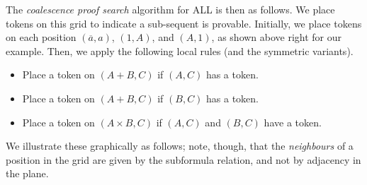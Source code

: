 \documentclass{article}
\newcommand\0{0}
\newcommand\1{1}
\newcommand\+{+}
\renewcommand\*{\times}
\theoremstyle{indented}
\newcommand\dual{\overline}
\begin{document}
        The \emph{coalescence proof search} algorithm for ALL is then as follows. We place tokens on this grid to indicate a sub-sequent is provable. Initially, we place tokens on each position $(\dual a,a)$, $(\1,A)$, and $(A,\1)$, as shown above right for our example. Then, we apply the following local rules (and the symmetric variants).
        \begin{itemize}
                \item Place a token on $(A\+B,C)$ if $(A,C)$ has a token.
                \item Place a token on $(A\+B,C)$ if $(B,C)$ has a token.
                \item Place a token on $(A\*B,C)$ if $(A,C)$ and $(B,C)$ have a token.
        \end{itemize}
        We illustrate these graphically as follows; note, though, that the \emph{neighbours} of a position in the grid are given by the subformula relation, and not by adjacency in the plane.
\end{document}
